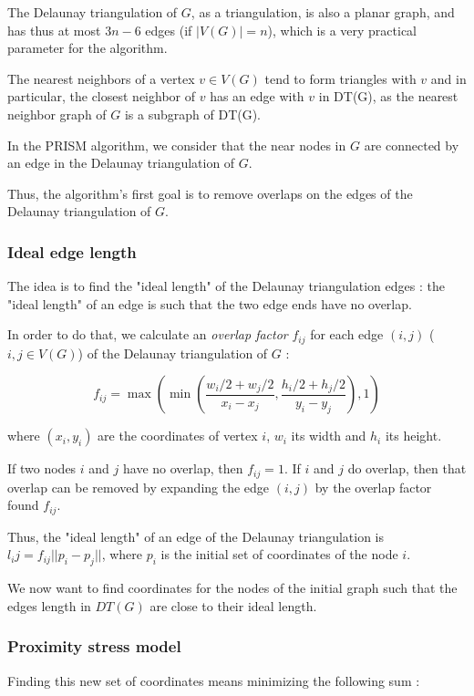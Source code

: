 \documentclass[12pt]{report}
\begin{document}
The Delaunay triangulation of $G$, as a triangulation, is also a planar graph, and has thus at most $3n -6$ edges (if $|V(G)| = n$), which is a very practical parameter for the algorithm.

\bigskip

The nearest neighbors of a vertex $v \in V(G)$ tend to form triangles with $v$ and in particular, the closest neighbor of $v$ has an edge with $v$ in DT(G), as the nearest neighbor graph of $G$ is a subgraph of DT(G).

In the PRISM algorithm, we consider that the near nodes in $G$ are connected by an edge in the Delaunay triangulation of $G$.

Thus, the algorithm's first goal is to remove overlaps on the edges of the Delaunay triangulation of $G$.

\subsubsection{Ideal edge length}
The idea is to find the "ideal length" of the Delaunay triangulation edges : the "ideal length" of an edge is such that the two edge ends have no overlap.

\bigskip
In order to do that, we calculate an \emph{overlap factor} $f_{ij}$ for each edge $(i,j)$ ($i,j \in V(G)$) of the Delaunay triangulation of $G$ :

\[ f_{ij} = \max ( \min (\frac{w_i/2 + w_j/2}{x_i - x_j}, 
\frac{h_i/2 + h_j/2}{y_i - y_j}), 1)\]

where $(x_i,y_i)$ are the coordinates of vertex $i$, $w_i$ its width and $h_i$ its height.

If two nodes $i$ and $j$ have no overlap, then $f_{ij} = 1$. 
If $i$ and $j$ do overlap, then that overlap can be removed by expanding the edge $(i,j)$ by the overlap factor found $f_{ij}$. %

\bigskip
Thus, the "ideal length" of an edge of the Delaunay triangulation is $l_ij = f_{ij}||p_i - p_j||$, where $p_i$ is the initial set of coordinates of the node $i$.

We now want to find coordinates for the nodes of the initial graph such that the edges length in $DT(G)$ are close to their ideal length.

\subsubsection{Proximity stress model}

Finding this new set of coordinates means minimizing the following sum :
\end{document}
